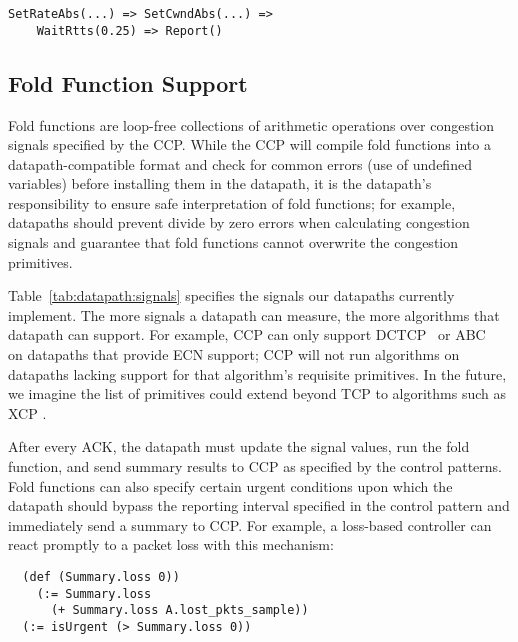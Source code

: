 \begin{verbatim}
SetRateAbs(...) => SetCwndAbs(...) => 
    WaitRtts(0.25) => Report()
\end{verbatim}

\subsection{Fold Function Support}
\label{s:datapath:fold}
Fold functions are loop-free collections of arithmetic operations over congestion signals specified by the CCP.
While the CCP will compile fold functions into a datapath-compatible format and check for common errors (\eg use of undefined variables) before installing them in the datapath, it is the datapath's responsibility to ensure safe interpretation of fold functions; for example, datapaths should prevent divide by zero errors when calculating congestion signals and guarantee that fold functions cannot overwrite the congestion primitives.

Table~\ref{tab:datapath:signals} specifies the signals our
datapaths currently implement. The more signals a datapath can measure, the more algorithms that datapath can support. For example, CCP can only support DCTCP~\cite{dctcp} or ABC~\cite{abc} on datapaths that provide ECN support; CCP will not run algorithms on datapaths lacking support for that algorithm's requisite primitives.
In the future, we imagine the list of primitives could extend beyond TCP to algorithms such as XCP \cite{xcp}.

%

After every ACK, the datapath must update the signal values, run the fold function, and send summary results to CCP as specified by the control patterns. Fold functions can also specify certain urgent conditions upon which the datapath should bypass the reporting interval specified in the control pattern and immediately send a summary to CCP. For example, a loss-based controller can react promptly to a packet loss with this mechanism:
\begin{verbatim}
  (def (Summary.loss 0))
    (:= Summary.loss 
      (+ Summary.loss A.lost_pkts_sample))
  (:= isUrgent (> Summary.loss 0))
\end{verbatim}

